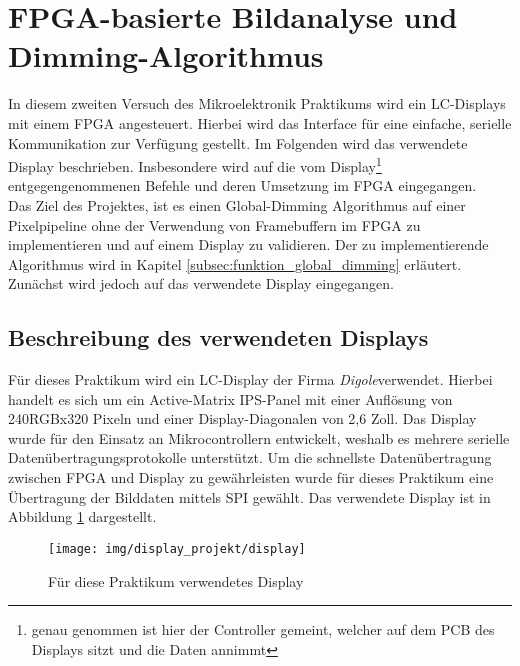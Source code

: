 \section{FPGA-basierte Bildanalyse und Dimming-Algorithmus}
\label{sec:PROJEKT}





In diesem zweiten Versuch des Mikroelektronik Praktikums wird ein LC-Displays mit einem FPGA angesteuert. Hierbei wird das Interface für eine einfache, serielle Kommunikation zur Verfügung gestellt. Im Folgenden wird das verwendete Display beschrieben. Insbesondere wird auf die vom Display\footnote{genau genommen ist hier der Controller gemeint, welcher auf dem PCB des Displays sitzt und die Daten annimmt} entgegengenommenen Befehle und deren Umsetzung im FPGA eingegangen.\\
Das Ziel des Projektes, ist es einen Global-Dimming Algorithmus auf einer Pixelpipeline ohne der Verwendung von Framebuffern im FPGA zu implementieren und auf einem Display zu validieren. Der zu implementierende Algorithmus wird in Kapitel \ref{subsec:funktion_global_dimming} erläutert. Zunächst wird jedoch auf das verwendete Display eingegangen.

\subsection{Beschreibung des verwendeten Displays}
\label{subsec:Display_Beschreibung}
Für dieses Praktikum wird ein LC-Display der Firma \emph{Digole}\cite{digole}verwendet. Hierbei handelt es sich um ein Active-Matrix IPS-Panel mit einer Auflösung von 240RGBx320 Pixeln und einer Display-Diagonalen von 2,6 Zoll. Das Display wurde für den Einsatz an Mikrocontrollern entwickelt, weshalb es mehrere serielle Datenübertragungsprotokolle unterstützt. Um die schnellste Datenübertragung zwischen FPGA und Display zu gewährleisten wurde für dieses Praktikum eine Übertragung der Bilddaten mittels SPI gewählt. Das verwendete Display ist in Abbildung \ref{fig:display} dargestellt.
\begin{figure}[H]
\centering
\texttt{[image: img/display\_projekt/display]}
\caption{Für diese Praktikum verwendetes Display}
\label{fig:display}
\end{figure}

